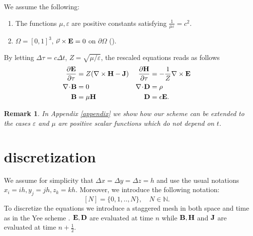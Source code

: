 \documentclass[12pt,reqno]{amsart}
\newcommand{\N}{\mathbb{N}}
\newtheorem{remark}[theorem]{Remark}
\newtheorem{rem}[theorem]{Remark}
\theoremstyle{definition}
\numberwithin{equation}{section}
\def\Gw{\Omega}     \def\Gx{\Xi}         \def\Gy{\Psi}
\begin{document}
We assume the following:
\begin{enumerate}
	\item  The functions $\mu,\varepsilon$ are    positive constants satisfying $\frac{1}{\mu \varepsilon}=c^2$.
	\item  $\Gw=[0,1]^3$, $\vec{\nu} \times {\bf E}=0$ on $\partial \Gw$ (\cite[Section 8]{rolf}).
\end{enumerate}
By letting  $\Delta \tau=c\Delta t$,  $Z=\sqrt{\mu/\varepsilon}$, the rescaled equations reads as follows
	\begin{align}
	\label{eq:maxwellv}
\frac{\partial {\bf E}}{\partial \tau }&=Z(\nabla \times \bf{H}-{\bf J}) & \frac{\partial {\bf H}}{\partial \tau }&=-\frac{1}{Z}\nabla \times {\bf E} \notag \\
	\nabla \!\cdot\! \bf{B} &= 0 & \nabla \!\cdot\! \bf{D} &= \rho \\
	\bf{B} &= \mu \bf{H} & \bf{D} &= \epsilon \bf{E}. \notag
\end{align}
\begin{rem}
	In Appendix \ref{appendix} we show how our scheme can be extended to the cases $\varepsilon$ and $\mu$ are positive scalar functions which do not depend on $t$.
\end{rem}


	\section{discretization}
	We assume for simplicity that $\Delta x=\Delta y=\Delta z=h$
	and  use the usual notations  $x_i=ih, y_j=jh,z_k=kh$.
	Moreover, we   introduce the following notation:
	$$
	[N]=\{0,1,..,N\},\quad N\in \N.
	$$
	To discretize the equations we introduce a staggered mesh in both space and time as in the Yee scheme \cite{yee}. 
	$\bf{E},\bf{D}$  are evaluated at time $n$ while $\bf{B},\bf{H}$ and $\bf{J}$ are evaluated at time $n\!+\! \frac{1}{2}$.
\end{document}
